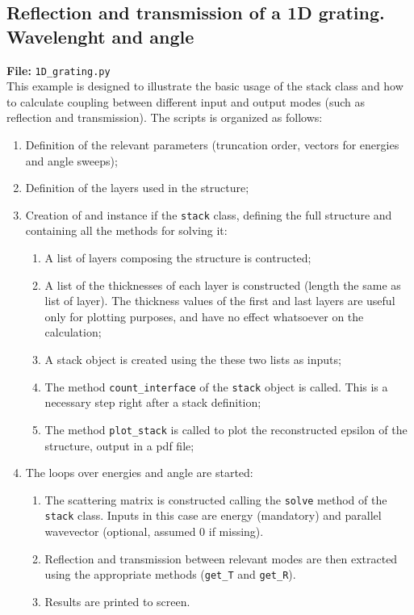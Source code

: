 \documentclass[a4paper,10pt]{report}
\begin{document}
\subsection{Reflection and transmission of a 1D grating. Wavelenght and angle} \label{ex:grating1d}
\textbf{File:} \texttt{1D\_grating.py} \\
This example is designed to illustrate the basic usage of the stack class and how to calculate coupling between different input and output modes (such as reflection and transmission). The scripts is organized as follows: 
\begin{enumerate}
\itemsep0em 
\item Definition of the relevant parameters (truncation order, vectors for energies and angle sweeps);
\item Definition of the layers used in the structure;
\item Creation of and instance if the \texttt{stack} class, defining the full structure and containing all the methods for solving it:
\begin{enumerate}
\itemsep0em
\item A list of layers composing the structure is contructed;
\item A list of the thicknesses of each layer is constructed (length the same as list of layer). The thickness values of the first and last layers are useful only for plotting purposes, and have no effect whatsoever on the calculation; 
\item A stack object is created using the these two lists as inputs;
\item The method \texttt{count\_interface} of the \texttt{stack} object is called. This is a necessary step right after a stack definition;
\item The method \texttt{plot\_stack} is called to plot the reconstructed epsilon of the structure, output in a pdf file;
\end{enumerate}
\item The loops over energies and angle are started:
\begin{enumerate}
\itemsep0em
\item The scattering matrix is constructed calling the \texttt{solve} method of the \texttt{stack} class. Inputs in this case are energy (mandatory) and parallel  wavevector (optional, assumed 0 if missing).
\item Reflection and transmission between relevant modes are then extracted using the appropriate methods (\texttt{get\_T} and \texttt{get\_R}).
\item Results are printed to screen. 
\end{enumerate}
\end{enumerate}
\end{document}
